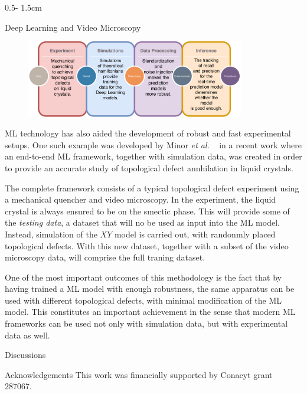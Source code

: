 \documentclass{uioposter}
\newcommand{\etal}{\emph{et al. }}
\begin{document}
\begin{frame}
\begin{columns}[onlytextwidth]
\begin{column}{0.5\textwidth - 1.5cm}
    \begin{block}{Deep Learning and Video Microscopy}
        \begin{figure}
            \centering
            \includegraphics[width=0.85\textwidth]{uioposter-images/fig1.pdf}
        \end{figure}

        ML technology has also aided the development of robust and fast experimental
        setups. One such example was developed by Minor \etal~\cite{endtoend2020} in a recent work where
        an end-to-end ML framework, together with simulation data, was created in order
        to provide an accurate study of topological defect annhilation in liquid
        crystals.

        The complete framework consists of a typical topological defect experiment
        using a mechanical quencher and video microscopy. In the experiment, the liquid
        crystal is always ensured to be on the smectic phase. This will provide some of the \emph{testing data},
        a dataset that will no be used as input into the ML model.
        Instead, simulation of the $XY$ model is carried out, with randonmly placed
        topological defects. With this new dataset, together with a subset of the
        video microscopy data, will comprise the full traning dataset.

        One of the most important outcomes of this methodology is the fact that by having
        trained a ML model with enough robustness, the same apparatus can be used with
        different topological defects, with minimal modification of the ML model.
        This constitutes an important achievement in the sense that modern ML frameworks
        can be used not only with simulation data, but with experimental data as well.
    \end{block}

    \begin{exampleblock}{Discussions}
    \end{exampleblock}

    \begin{exampleblock}{Acknowledgements}
        This work was financially supported by Conacyt grant 287067.
    \end{exampleblock}

    
\end{column}


\end{columns}


\end{frame}
\end{document}
